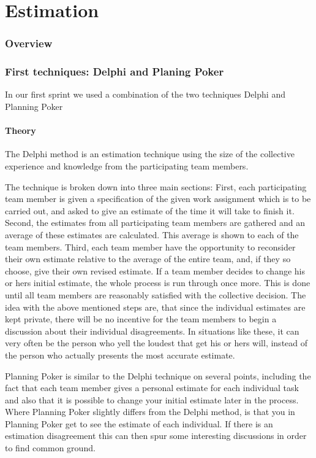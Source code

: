 \part{Estimation}
\section{Overview}
\section{First techniques: Delphi and Planing Poker}
In our first sprint we used a combination of the two techniques Delphi and Planning Poker

\subsection{Theory}


The Delphi method is an estimation technique using the size of the collective experience and knowledge from the participating team members.

The technique is broken down into three main sections:
First, each participating team member is given a specification of the given work assignment which is to be carried out, and asked to give an estimate of the time it will take to finish it.
Second, the estimates from all participating team members are gathered and an average of these estimates are calculated. This average is shown to each of the team members.
Third, each team member have the opportunity to reconsider their own estimate relative to the average of the entire team, and, if they so choose, give their own revised estimate.
If a team member decides to change his or hers initial estimate, the whole process is run through once more. This is done until all team members are reasonably satisfied with the collective decision. 
The idea with the above mentioned steps are, that since the individual estimates are kept private, there will be no incentive for the team members to begin a discussion about their individual disagreements. In situations like these, it can very often be the person who yell the loudest that get his or hers will, instead of the person who actually presents the most accurate estimate.


Planning Poker is similar to the Delphi technique on several points, including the fact that each team member gives a personal estimate for each individual task and also that it is possible to change your initial estimate later in the process. Where Planning Poker slightly differs from the Delphi method, is that you in Planning Poker get to see the estimate of each individual. If there is an estimation disagreement this can then spur some interesting discussions in order to find common ground. 

